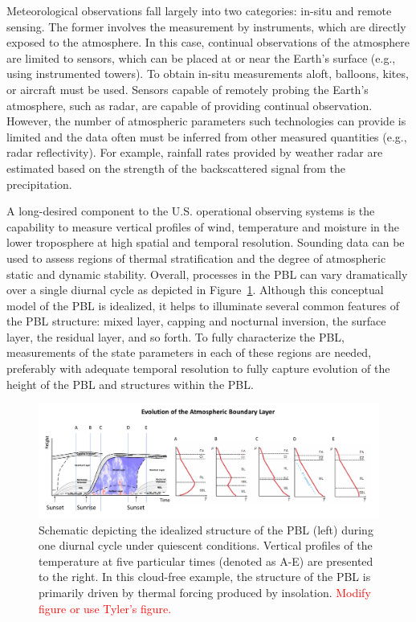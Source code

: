 \documentclass[sensors,review,submit,moreauthors,pdftex,10pt,a4paper]{mdpi}
\theoremstyle{mdpi}
\newcounter{ex}
\newcounter{re}
\theoremstyle{mdpidefinition}
\begin{document}
Meteorological observations fall largely into two categories: in-situ and remote sensing. The former involves the measurement by instruments, which are directly exposed to the atmosphere. In this case, continual observations of the atmosphere are limited to sensors, which can be placed at or near the Earth's surface (e.g., using instrumented towers). To obtain in-situ measurements aloft, balloons, kites, or aircraft must be used. Sensors capable of remotely probing the Earth's atmosphere, such as radar, are capable of providing continual observation. However, the number of atmospheric parameters such technologies can provide is limited and the data often must be inferred from other measured quantities (e.g., radar reflectivity).  For example, rainfall rates provided by weather radar are estimated based on the strength of the backscattered signal from the precipitation.

A long-desired component to the U.S. operational observing systems is the capability to measure vertical profiles of wind, temperature and moisture in the lower troposphere at high spatial and temporal resolution. Sounding data can be used to assess regions of thermal stratification and the degree of atmospheric static and dynamic stability. Overall, processes in the PBL can vary dramatically over a single diurnal cycle as depicted in Figure~\ref{fig:ABLCartoon}. Although this conceptual model of the PBL is idealized, it helps to illuminate several common features of the PBL structure: mixed layer, capping and nocturnal inversion, the surface layer, the residual layer, and so forth. To fully characterize the PBL, measurements of the state parameters in each of these regions are needed, preferably with adequate temporal resolution to fully capture evolution of the height of the PBL and structures within the PBL.

\begin{figure}
\centering
\includegraphics[angle=0, width=\textwidth]{figures/ABL.pdf}
\caption{\label{fig:ABLCartoon} Schematic depicting the idealized structure of the PBL (left) during one diurnal cycle under quiescent conditions. Vertical profiles of the temperature at five particular times (denoted as A-E) are presented to the right. In this cloud-free example, the structure of the PBL is primarily driven by thermal forcing produced by insolation. \textcolor{red}{Modify figure or use Tyler's figure.}}
\end{figure}
\end{document}
